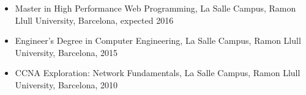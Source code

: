 \begin{itemize}

    \item Master in High Performance Web Programming, La Salle Campus, Ramon Llull University, Barcelona, expected 2016

    \item Engineer's Degree in Computer Engineering, La Salle Campus, Ramon Llull University, Barcelona, 2015

    \item CCNA Exploration: Network Fundamentals, La Salle Campus, Ramon Llull University, Barcelona, 2010

\end{itemize}